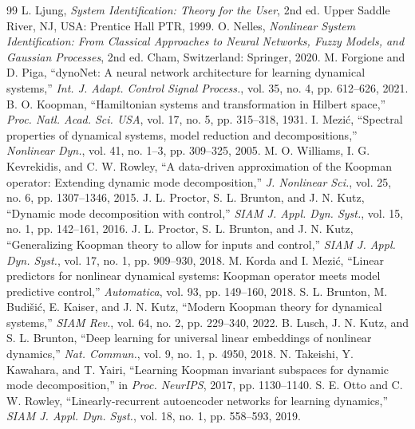 \documentclass[journal]{IEEEtran}
\begin{document}
\begin{thebibliography}{99}
L. Ljung, \emph{System Identification: Theory for the User}, 2nd ed. Upper Saddle River, NJ, USA: Prentice Hall PTR, 1999.
O. Nelles, \emph{Nonlinear System Identification: From Classical Approaches to Neural Networks, Fuzzy Models, and Gaussian Processes}, 2nd ed. Cham, Switzerland: Springer, 2020.
M. Forgione and D. Piga, ``dynoNet: A neural network architecture for learning dynamical systems,'' \emph{Int. J. Adapt. Control Signal Process.}, vol. 35, no. 4, pp. 612--626, 2021.
B. O. Koopman, ``Hamiltonian systems and transformation in Hilbert space,'' \emph{Proc. Natl. Acad. Sci. USA}, vol. 17, no. 5, pp. 315--318, 1931.
I. Mezi\'c, ``Spectral properties of dynamical systems, model reduction and decompositions,'' \emph{Nonlinear Dyn.}, vol. 41, no. 1--3, pp. 309--325, 2005.
M. O. Williams, I. G. Kevrekidis, and C. W. Rowley, ``A data-driven approximation of the Koopman operator: Extending dynamic mode decomposition,'' \emph{J. Nonlinear Sci.}, vol. 25, no. 6, pp. 1307--1346, 2015.
J. L. Proctor, S. L. Brunton, and J. N. Kutz, ``Dynamic mode decomposition with control,'' \emph{SIAM J. Appl. Dyn. Syst.}, vol. 15, no. 1, pp. 142--161, 2016.
J. L. Proctor, S. L. Brunton, and J. N. Kutz, ``Generalizing Koopman theory to allow for inputs and control,'' \emph{SIAM J. Appl. Dyn. Syst.}, vol. 17, no. 1, pp. 909--930, 2018.
M. Korda and I. Mezi\'c, ``Linear predictors for nonlinear dynamical systems: Koopman operator meets model predictive control,'' \emph{Automatica}, vol. 93, pp. 149--160, 2018.
S. L. Brunton, M. Budi\v{s}i\'c, E. Kaiser, and J. N. Kutz, ``Modern Koopman theory for dynamical systems,'' \emph{SIAM Rev.}, vol. 64, no. 2, pp. 229--340, 2022.
B. Lusch, J. N. Kutz, and S. L. Brunton, ``Deep learning for universal linear embeddings of nonlinear dynamics,'' \emph{Nat. Commun.}, vol. 9, no. 1, p. 4950, 2018.
N. Takeishi, Y. Kawahara, and T. Yairi, ``Learning Koopman invariant subspaces for dynamic mode decomposition,'' in \emph{Proc. NeurIPS}, 2017, pp. 1130--1140.
S. E. Otto and C. W. Rowley, ``Linearly-recurrent autoencoder networks for learning dynamics,'' \emph{SIAM J. Appl. Dyn. Syst.}, vol. 18, no. 1, pp. 558--593, 2019.

\end{thebibliography}
\end{document}
